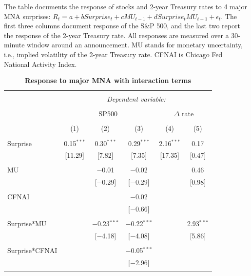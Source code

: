 \documentclass[12pt]{article}
\begin{document}
\begin{table}[!htbp] \centering 
  \caption{\textbf{Response to major MNA with interaction terms}} 
  \label{}
    \begin{flushleft}
    {\medskip\small
 The table documents the response of stocks and 2-year Treasury rates to 4 major MNA surprises: $R_t = a + b Surprise_t + c MU_{t-1} + d Surprise_t MU_{t-1} + \epsilon_t.$ The first three columns document response of the S\&P 500, and the last two report the response of the 2-year Treasury rate. All responses are measured over a 30-minute window around an announcement. MU stands for monetary uncertainty, i.e., implied volatility of the 2-year Treasury rate. CFNAI is Chicago Fed National Activity Index.}
    \medskip
    \end{flushleft}
\begin{tabular}{@{\extracolsep{5pt}}lccccc} 
\\[-1.8ex]\hline 
\hline \\[-1.8ex] 
 & \multicolumn{5}{c}{\textit{Dependent variable:}} \\ 
\cline{2-6} 
\\[-1.8ex] & \multicolumn{3}{c}{SP500} & \multicolumn{2}{c}{$\Delta$ rate} \\ 
\\[-1.8ex] & (1) & (2) & (3) & (4) & (5)\\ 
\hline \\[-1.8ex] 
 Surprise & 0.15$^{***}$ & 0.30$^{***}$ & 0.29$^{***}$ & 2.16$^{***}$ & 0.17 \\ 
  & [11.29] & [7.82] & [7.35] & [17.35] & [0.47] \\ 
  & & & & & \\ 
 MU &  & $-$0.01 & $-$0.02 &  & 0.46 \\ 
  &  & [$-$0.29] & [$-$0.29] &  & [0.98] \\ 
  & & & & & \\ 
 CFNAI &  &  & $-$0.02 &  &  \\ 
  &  &  & [$-$0.66] &  &  \\ 
  & & & & & \\ 
 Surprise*MU &  & $-$0.23$^{***}$ & $-$0.22$^{***}$ &  & 2.93$^{***}$ \\ 
  &  & [$-$4.18] & [$-$4.08] &  & [5.86] \\ 
  & & & & & \\ 
 Surprise*CFNAI &  &  & $-$0.05$^{***}$ &  &  \\ 
  &  &  & [$-$2.96] &  &  \\ 
  & & & & & \\ 

\end{tabular}
\end{table}
\end{document}
